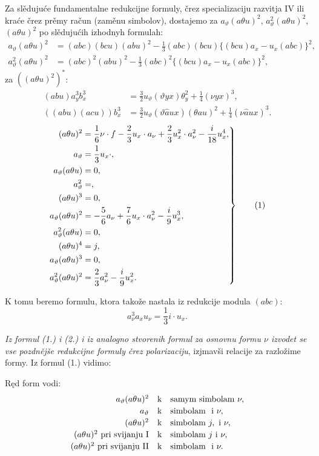 \documentclass[11pt]{article}
\let\A\relax
\newcommand{\A}{\mathfrak A}
\begin{document}
Za slědujuće fundamentalne redukcijne formuly, črez specializaciju razvitja IV ili kraće črez prěmy račun (zaměnu simbolov), dostajemo za $a_\vartheta(a\theta u)^2$, $a_\vartheta^2(a\theta u)^2$, $(a\theta u)^2$ po slědujućih izhodnyh formulah:
\[
\begin{aligned}
a_\vartheta(a\theta u)^2
&=(abc)(bcu)(abu)^2-\frac13(abc)(bcu)\{(bcu)a_x-u_x(abc)\}^2,\\
a_\vartheta^2(a\theta u)^2
&=(abc)^2(abu)^2-\frac13(abc)^2\{(bcu)a_x-u_x(abc)\}^2,
\end{aligned}
\]
za $((a\theta u)^2)^{*}$:
\[
\begin{aligned}
(abu)a_y^3b_x^3&=\frac32u_\vartheta(\vartheta yx)\theta_y^2+\frac14(\nu yx)^3,\\
((abu)(acu))b_x^3&=\frac32u_\vartheta(\vartheta\widehat{a}ux)(\theta au)^2+\frac14(\nu\widehat{a}ux)^3.
\end{aligned}
\]
\begingroup\small
\[
\left.
\begin{aligned}
(a\theta u)^2&=\frac16\nu\cdot f-\frac23u_x\cdot a_\nu
+\frac23u_x^2\cdot a_\nu^2-\frac{i}{18}u_x^4,\\
a_\vartheta&=\frac13u_x\cdot\A,\\
a_\vartheta(a\theta u)&=0,\\
a_\vartheta^2&=\A,\\
(a\theta u)^3&=0,\\
a_\vartheta(a\theta u)^2&=-\frac56a_\nu+\frac76u_x\cdot a_\nu^2-\frac{i}{9}u_x^3,\\
a_\vartheta^2(a\theta u)&=0,\\
(a\theta u)^4&=j,\\
a_\vartheta(a\theta u)^3&=0,\\
a_\vartheta^2(a\theta u)^2&=\frac23a_\nu^2-\frac{i}{9}u_x^2.
\end{aligned}
\right\} \tag{1}
\]
\endgroup

K tomu beremo formulu, ktora takože nastala iz redukcije modula $(abc)$:
\[
a_\nu^3a_xu_\nu=\frac13 i\cdot u_x. \tag{2}
\]

{\itshape Iz formul (1.) i (2.) i iz analogno stvorenih formul za osnovnu formu $\nu$ izvodet se vse pozdnějše redukcijne formuly črez polarizaciju}, izjmavši relacije za razložime formy. Iz formul (1.) vidimo:

Ręd form vodi:
\[
\begin{array}{rcl}
a_\vartheta(a\theta u)^2 &\text{k}& \text{samym simbolam }\nu,\\[0.2em]
a_\vartheta &\text{k}& \text{simbolam }\A\text{ i }\nu,\\[0.2em]
(a\theta u)^2 &\text{k}& \text{simbolam }j,\A\text{ i }\nu,\\[0.2em]
(a\theta u)^2\text{ pri svijanju I} &\text{k}& \text{simbolam }j\text{ i }\nu,\\[0.2em]
(a\theta u)^2\text{ pri svijanju II} &\text{k}& \text{simbolam }\A\text{ i }\nu.
\end{array}
\]
\end{document}
